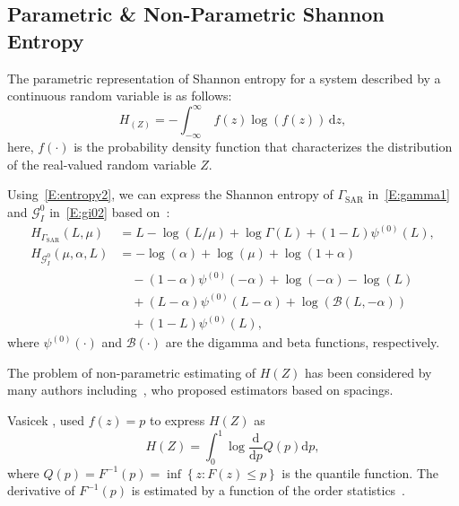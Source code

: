 \documentclass[conference]{IEEEtran}
\begin{document}
\subsection{Parametric \& Non-Parametric Shannon Entropy}

The parametric representation of Shannon entropy for a system described by a continuous random variable is as follows:
\begin{equation}
  \label{E:entropy2}
  H_(Z)=-\int_{-\infty }^\infty \ f(z)\log(f(z))\, \mathrm{d}z,
\end{equation}
here, $f(\cdot)$ is the probability density function that characterizes the distribution of the real-valued random variable $Z$.

Using~\eqref{E:entropy2}, we can express the Shannon entropy of $\Gamma_{\text{SAR}}$ in~\eqref{E:gamma1} and $\mathcal{G}_I^0$ in~\eqref{E:gi02} based on~\cite{Cassetti2022, A.Ferreira2020}:
\begin{align}
H_{\Gamma_{\text{SAR}}}(L, \mu) &=   L -\log(L/\mu)+\log\Gamma(L)+(1-L)\psi^{(0)}(L), \label{E:E-gamma}\\
H_{\mathcal{G}_I^0}(\mu, \alpha, L) &= -\log(\alpha)+\log(\mu)+\log(1+\alpha)\nonumber \\
&\quad -(1-\alpha)\psi^{(0)}(-\alpha) +\log(-\alpha)-\log(L) \nonumber \\
&\quad + (L-\alpha)\psi^{(0)}(L-\alpha) +\log\left(\mathcal{B}(L,-\alpha)\right)\nonumber \\
&\quad  + (1-L)\psi^{(0)}(L), \label{E:E-GIO}
\end{align}
where $\psi^{(0)}(\cdot)$ and $\mathcal{B}(\cdot)$ are the digamma and beta functions, respectively.







The problem of non-parametric estimating of $H(Z)$ has been considered by many authors including~\cite{vasicek1976test, Bert1992, Wieczorkowski1999, correa1995new}, who proposed estimators based on spacings.

Vasicek \cite{vasicek1976test}, used $f(z)=p$  to express $ H(Z)$ as
\begin{equation*}
	H(Z)= \int_0^1 \log\frac{\mathrm{d}}{\mathrm{d}p}Q(p)\mathrm{d}p,
\end{equation*}
where $Q(p)=F^{-1}(p)=\inf\left\{z: F(z)\leq p\right\}$ is the quantile function. The derivative of $F^{-1}(p)$ is  estimated by a function of the order statistics~\cite{AlOmari2019}.
\end{document}
